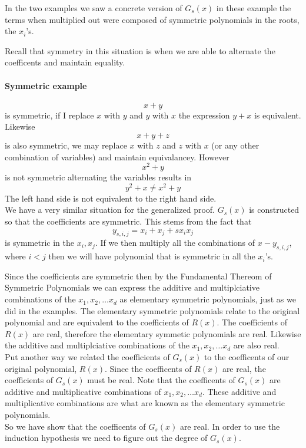 \documentclass[12pt]{article}
\begin{document}
In the two examples we saw a concrete version of $G_s(x)$ in these example the terms when multiplied out were composed of symmetric polynomials in the roots, the $x_i$'s.  

Recall that symmetry in this situation is when we are able to alternate the coefficents and maintain equality.  
\paragraph*{Symmetric example}
$$ x + y $$ is symmetric, if I replace $x$ with $y$ and $y$ with $x$ the expression $y+x$ is equivalent.  Likewise $$ x+y+z$$ is also symmetric, we may replace $x$ with $z$ and $z$ with $x$ (or any other combination of variables) and maintain equivalancey.  However $$ x^2 + y$$ is not symmetric alternating the variables results in $$ y^2 + x \neq x^2 + y$$  The left hand side is not equivalent to the right hand side.\\

We have a very similar situation for the generalized proof.  $G_s(x)$ is constructed so that the coefficients are symmetric.  This stems from the fact that $$y_{s,i,j} = x_i + x_j + s x_i x_j$$ is symmetric in the $x_i, x_j$.    If we then multiply all the combinations of $x-y_{s,i,j}$, where $i<j$ then we will have polynomial that is symmetric in all the $x_i$'s.

 
  Since the coefficients are symmetric then by the Fundamental Thereom of Symmetric Polynomials we can express the additive and multiplciative combinations of the $x_1, x_2, \ldots x_d$ as elementary symmetric polynomials, just as we did in the examples. The elementary symmetric polynomials relate to the original polynomial and are equivalent to the coefficients of $R(x)$.  The coefficients of $R(x)$ are real, therefore the elementary symmetic polynomials are real.  Likewise the additive and multiplciative combinations of the $x_1, x_2, \ldots x_d$ are also real.\\
  
  Put another way we related the coefficients of $G_s(x)$ to the coefficents of our original polynomial, $R(x)$.  Since the coefficents of $R(x)$ are real, the coefficients of $G_s(x)$ must be real.  Note that the coefficents of $G_s(x)$ are additive and multiplicative combinations of $x_1, x_2, \ldots x_d$.  These additive and multiplicative combinations are what are known as the elementary symmetric polynomials.\\
  
  So we have show that the coefficents of $G_s(x)$ are real.  In order to use the induction hypothesis we need to figure out the degree of $G_s(x)$.
\end{document}
